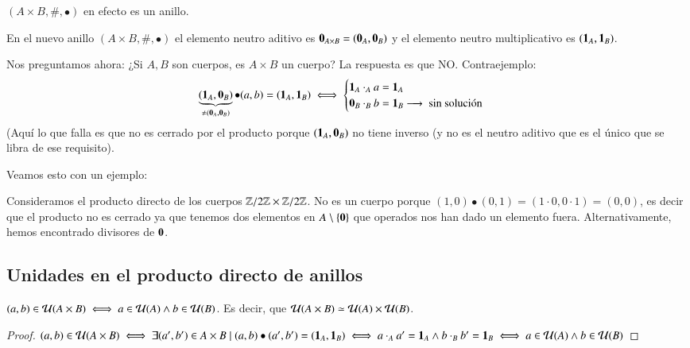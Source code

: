 \begin{pro}
	\label{pro:prodirectodeanillos}
	$(A\times B, \#, \bullet)$ en efecto es un anillo.
\end{pro}

\begin{obs}
	En el nuevo anillo $(A\times B, \#, \bullet)$ el elemento neutro aditivo es $\mathbf{0}_{A\times B} = (\mathbf{0}_A, \mathbf{0}_B)$ y el elemento neutro multiplicativo es $(\mathbf{1}_A, \mathbf{1}_B)$.
\end{obs}

\begin{obs}
	Nos preguntamos ahora: ¿Si $A, B$ son cuerpos, es $A \times B$ un cuerpo? La respuesta es que NO. Contraejemplo:
	\begin{align*}
	\underbrace{(\mathbf{1}_A,\mathbf{0}_B)}_{\neq (\mathbf{0}_A, \mathbf{0}_B)} \bullet (a,b) = (\mathbf{1}_A, \mathbf{1}_B) \iff \begin{cases}
	\mathbf{1}_A \cdot_A a = \mathbf{1}_A \\
	\mathbf{0}_B \cdot_B b = \mathbf{1}_B \longrightarrow\text{ sin solución }
	\end{cases}
	\end{align*}
	(Aquí lo que falla es que no es cerrado por el producto porque $(\mathbf{1}_A, \mathbf{0}_B)$ no tiene inverso (y no es el neutro aditivo que es el único que se libra de ese requisito).
\end{obs}

Veamos esto con un ejemplo:

\begin{ej}
	Consideramos el producto directo de los cuerpos $\mathbb{Z}/2\mathbb{Z} \times \mathbb{Z}/2\mathbb{Z}$. No es un cuerpo porque $(1,0) \bullet (0, 1) = (1\cdot 0, 0 \cdot 1) = (0,0)$, es decir que el producto no es cerrado ya que tenemos dos elementos en $A\setminus \{\mathbf{0}\}$ que operados nos han dado un elemento fuera. Alternativamente, hemos encontrado divisores de $\mathbf{0}$.
\end{ej}

\subsection{Unidades en el producto directo de anillos}

\begin{pro}
	\label{pro:udsproductodirectoanillos}
	$(a,b) \in \mathcal{U}(A \times B) \iff a \in \mathcal{U}(A) \land b \in \mathcal{U}(B)$. Es decir, que $\mathcal{U}(A \times B) \simeq \mathcal{U}(A) \times \mathcal{U}(B)$.
\end{pro}

\begin{proof}
	$(a,b) \in \mathcal{U}(A \times B) \iff \exists (a',b') \in A\times B \mid (a,b) \bullet (a', b') = (\mathbf{1}_A, \mathbf{1}_B) \iff a\cdot_A a' = \mathbf{1}_A \land b\cdot_B b' = \mathbf{1}_B \iff a \in \mathcal{U}(A) \land b \in \mathcal{U}(B)$
\end{proof}

